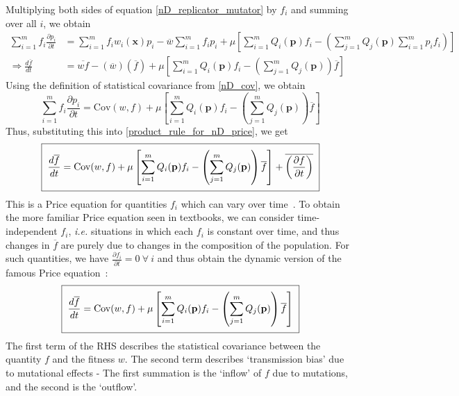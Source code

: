Multiplying both sides of equation \eqref{nD_replicator_mutator} by $f_i$ and summing over all $i$, we obtain
\begin{align*}
\sum\limits_{i=1}^{m}f_i\frac{\partial p_i}{\partial t} &= \sum\limits_{i=1}^{m}f_iw_i(\mathbf{x})p_i - \overline{w}\sum\limits_{i=1}^{m}f_ip_i + \mu\left[\sum\limits_{i=1}^{m}Q_i(\mathbf{p})f_i - \left(\sum\limits_{j=1}^{m}Q_j(\mathbf{p})\sum\limits_{i=1}^{m}p_if_i\right)\right]\\
\Rightarrow \frac{d\overline{f}}{dt} &= \overline{wf}-(\overline{w})(\overline{f}) + \mu\left[\sum\limits_{i=1}^{m}Q_i(\mathbf{p})f_i - \left(\sum\limits_{j=1}^{m}Q_j(\mathbf{p})\right)\overline{f}\right]
\end{align*}
Using the definition of statistical covariance from \eqref{nD_cov}, we obtain
\begin{equation}
\sum\limits_{i=1}^{m}f_i\frac{\partial p_i}{\partial t} = \mathrm{Cov}(w,f) + \mu\left[\sum\limits_{i=1}^{m}Q_i(\mathbf{p})f_i - \left(\sum\limits_{j=1}^{m}Q_j(\mathbf{p})\right)\overline{f}\right] 
\end{equation}
Thus, substituting this into \eqref{product_rule_for_nD_price}, we get
\begin{equation}
\label{nD_Price_time_dependent}
\setlength{\fboxsep}{2\fboxsep}\boxed{\frac{d\overline{f}}{dt} = \mathrm{Cov}(w,f) + \mu\left[\sum\limits_{i=1}^{m}Q_i(\mathbf{p})f_i - \left(\sum\limits_{j=1}^{m}Q_j(\mathbf{p})\right)\overline{f}\right] + \overline{\left(\frac{\partial f}{\partial t}\right)}}
\end{equation}
This is a Price equation for quantities $f_i$ which can vary over time~\citep{lion_theoretical_2018,day_price_2020}. To obtain the more familiar Price equation seen in textbooks, we can consider time-independent $f_i$, \emph{i.e.} situations in which each $f_i$ is constant over time, and thus changes in $\overline{f}$ are purely due to changes in the composition of the population. For such quantities, we have $\frac{\partial f_i}{\partial t} = 0 \ \forall \ i$ and thus obtain the dynamic version of the famous Price equation~\citep{page_unifying_2002,lion_theoretical_2018}:
\begin{equation}
\label{nD_Price}
\setlength{\fboxsep}{2\fboxsep}\boxed{
	\frac{d\overline{f}}{dt} = \mathrm{Cov}(w,f) + \mu\left[\sum\limits_{i=1}^{m}Q_i(\mathbf{p})f_i - \left(\sum\limits_{j=1}^{m}Q_j(\mathbf{p})\right)\overline{f}\right]}
\end{equation}
The first term of the RHS describes the statistical covariance between the quantity $f$ and the fitness $w$. The second term describes `transmission bias' due to mutational effects - The first summation is the `inflow' of $f$ due to mutations, and the second is the `outflow'.

